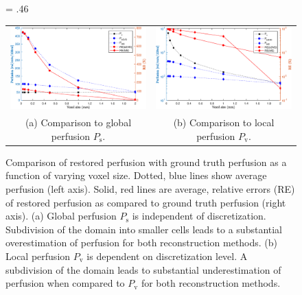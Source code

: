 \documentclass[aps,prb,article,groupedaddress,showkeys]{revtex4}
\begin{document}
    \begin{figure}[!htb]
    	\centering
    	\fwd = .46\textwidth
    	\begin{tabular}{c c}
    		\includegraphics[width=\fwd]{figs/E110_CBFOnDifferentResolutions_plot-Ps-scaleto-none.eps} & \includegraphics[width=\fwd]{figs/E110_CBFOnDifferentResolutions_plot-Pv-scaleto-none.eps}\\	
    		(a) Comparison to global perfusion $P_{\mathrm{s}}$. & (b) Comparison to local perfusion $P_{\mathrm{v}}$. \\
    	\end{tabular}
    	\caption{Comparison of restored perfusion with ground truth perfusion as a function of varying voxel size. Dotted, blue lines show average perfusion (left axis). Solid, red lines are average, relative errors (RE) of restored perfusion as compared to ground truth perfusion (right axis). (a) Global perfusion $P_{\mathrm{s}}$ is independent of discretization.  Subdivision of the domain into smaller cells leads to a substantial overestimation of perfusion for both reconstruction methods. (b) Local perfusion $P_{\mathrm{v}}$ is dependent on discretization level. A subdivision of the domain leads to substantial underestimation of perfusion when compared to $P_{\mathrm{v}}$ for both reconstruction methods.}
            \label{fig:volnormperf}
    \end{figure}
    
\end{document}
